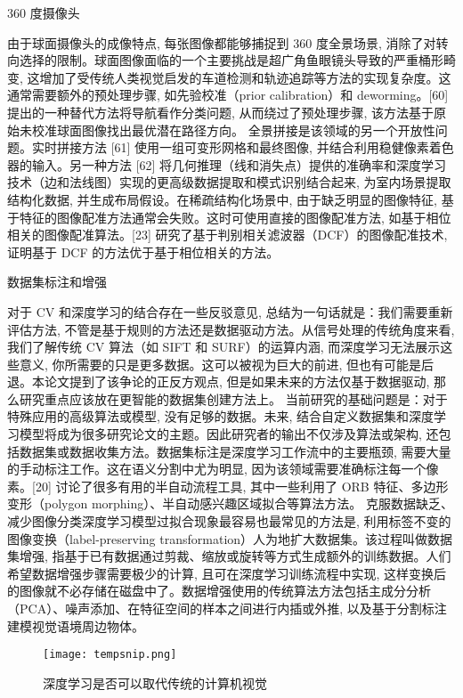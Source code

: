 360 度摄像头

由于球面摄像头的成像特点, 每张图像都能够捕捉到 360 度全景场景, 消除了对转向选择的限制。球面图像面临的一个主要挑战是超广角鱼眼镜头导致的严重桶形畸变, 这增加了受传统人类视觉启发的车道检测和轨迹追踪等方法的实现复杂度。这通常需要额外的预处理步骤, 如先验校准（prior calibration）和 deworming。[60] 提出的一种替代方法将导航看作分类问题, 从而绕过了预处理步骤, 该方法基于原始未校准球面图像找出最优潜在路径方向。
全景拼接是该领域的另一个开放性问题。实时拼接方法 [61] 使用一组可变形网格和最终图像, 并结合利用稳健像素着色器的输入。另一种方法 [62] 将几何推理（线和消失点）提供的准确率和深度学习技术（边和法线图）实现的更高级数据提取和模式识别结合起来, 为室内场景提取结构化数据, 并生成布局假设。在稀疏结构化场景中, 由于缺乏明显的图像特征, 基于特征的图像配准方法通常会失败。这时可使用直接的图像配准方法, 如基于相位相关的图像配准算法。[23] 研究了基于判别相关滤波器（DCF）的图像配准技术, 证明基于 DCF 的方法优于基于相位相关的方法。

数据集标注和增强

对于 CV 和深度学习的结合存在一些反驳意见, 总结为一句话就是：我们需要重新评估方法, 不管是基于规则的方法还是数据驱动方法。从信号处理的传统角度来看, 我们了解传统 CV 算法（如 SIFT 和 SURF）的运算内涵, 而深度学习无法展示这些意义, 你所需要的只是更多数据。这可以被视为巨大的前进, 但也有可能是后退。本论文提到了该争论的正反方观点, 但是如果未来的方法仅基于数据驱动, 那么研究重点应该放在更智能的数据集创建方法上。
当前研究的基础问题是：对于特殊应用的高级算法或模型, 没有足够的数据。未来, 结合自定义数据集和深度学习模型将成为很多研究论文的主题。因此研究者的输出不仅涉及算法或架构, 还包括数据集或数据收集方法。数据集标注是深度学习工作流中的主要瓶颈, 需要大量的手动标注工作。这在语义分割中尤为明显, 因为该领域需要准确标注每一个像素。[20] 讨论了很多有用的半自动流程工具, 其中一些利用了 ORB 特征、多边形变形（polygon morphing）、半自动感兴趣区域拟合等算法方法。
克服数据缺乏、减少图像分类深度学习模型过拟合现象最容易也最常见的方法是, 利用标签不变的图像变换（label-preserving transformation）人为地扩大数据集。该过程叫做数据集增强, 指基于已有数据通过剪裁、缩放或旋转等方式生成额外的训练数据。人们希望数据增强步骤需要极少的计算, 且可在深度学习训练流程中实现, 这样变换后的图像就不必存储在磁盘中了。数据增强使用的传统算法方法包括主成分分析（PCA）、噪声添加、在特征空间的样本之间进行内插或外推, 以及基于分割标注建模视觉语境周边物体。

\begin{figure}[H]
\centering
\texttt{[image: tempsnip.png]}
\caption{深度学习是否可以取代传统的计算机视觉}
\label{tempsnip}
\end{figure}

